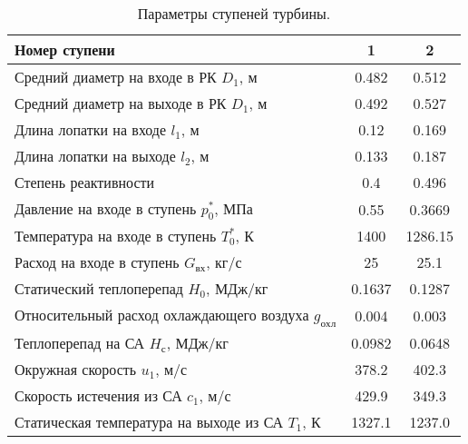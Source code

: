 \documentclass[a4paper,10pt]{article}
\begin{document}
    
    \begin{longtable}{
    |p{8cm}|
%    
    c|
%    
    c|
%    
    }
        \caption{Параметры ступеней турбины.} \\ \hline
        Номер ступени
%        
        & 1
%        
        & 2
%        
        \\ \hline
        Средний диаметр на входе в РК $D_1$, м
%        
        & 0.482
%        
        & 0.512
%        
        \\ \hline
        Средний диаметр на выходе в РК $D_1$, м
%        
        & 0.492
%        
        & 0.527
%        
        \\ \hline
        Длина лопатки на входе  $l_1$, м
%        
        & 0.12
%        
        & 0.169
%        
        \\ \hline
        Длина лопатки на выходе  $l_2$, м
%        
        & 0.133
%        
        & 0.187
%        
        \\ \hline
        Степень реактивности
%        
        & 0.4
%        
        & 0.496
%        
        \\ \hline
        Давление на входе в ступень $p_0^*$, МПа
%        
        & 0.55
%        
        & 0.3669
%        
        \\ \hline
        Температура на входе в ступень $T_0^*$, К
%        
        & 1400
%        
        & 1286.15
%        
        \\ \hline
        Расход на входе в ступень $G_{вх}$, кг/с
%        
        & 25
%        
        & 25.1
%        
        \\ \hline
        Статический теплоперепад $H_0$, МДж/кг
%        
        & 0.1637
%        
        & 0.1287
%        
        \\ \hline
        Относительный расход охлаждающего воздуха $g_{охл}$
%        
        & 0.004
%        
        & 0.003
%        
        \\ \hline
        Теплоперепад на СА $H_с$, МДж/кг
%        
        & 0.0982
%        
        & 0.0648
%        
        \\ \hline
        Окружная скорость $u_1$, м/с
%        
        & 378.2
%        
        & 402.3
%        
        \\ \hline
        Скорость истечения из СА $c_1$, м/с
%        
        & 429.9
%        
        & 349.3
%        
        \\ \hline
        Статическая температура на выходе из СА $T_1$, К
%        
        & 1327.1
%        
        & 1237.0

\end{longtable}
\end{document}
